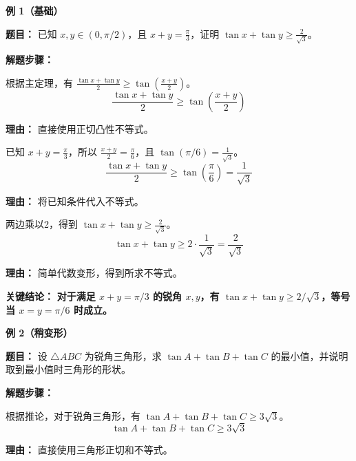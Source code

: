\begin{examplebox}
\textbf{\textcolor{CExample}{例 1（基础）}}

\textbf{\textcolor{CExample}{题目：}} 已知 $x, y \in (0, \pi/2)$，且 $x+y = \frac{\pi}{3}$，证明 $\tan x + \tan y \geq \frac{2}{\sqrt{3}}$。

\textbf{\textcolor{CExample}{解题步骤：}}
\begin{description}[style=nextline, leftmargin=2.8em, labelsep=0.5em, itemsep=0.45em]
    \item[\textbf{第一步（应用主定理）：}] 根据主定理，有 $\frac{\tan x + \tan y}{2} \geq \tan\left(\frac{x+y}{2}\right)$。
    \[
    \frac{\tan x + \tan y}{2} \geq \tan\left(\frac{x+y}{2}\right)
    \]
    \par\textbf{理由：}
    直接使用正切凸性不等式。

    \item[\textbf{第二步（代入已知）：}] 已知 $x+y = \frac{\pi}{3}$，所以 $\frac{x+y}{2} = \frac{\pi}{6}$，且 $\tan(\pi/6) = \frac{1}{\sqrt{3}}$。
    \[
    \frac{\tan x + \tan y}{2} \geq \tan\left(\frac{\pi}{6}\right) = \frac{1}{\sqrt{3}}
    \]
    \par\textbf{理由：}
    将已知条件代入不等式。

    \item[\textbf{第三步（整理结论）：}] 两边乘以2，得到 $\tan x + \tan y \geq \frac{2}{\sqrt{3}}$。
    \[
    \tan x + \tan y \geq 2 \cdot \frac{1}{\sqrt{3}} = \frac{2}{\sqrt{3}}
    \]
    \par\textbf{理由：}
    简单代数变形，得到所求不等式。
\end{description}

\textbf{\textcolor{CExample}{关键结论：}} \textbf{对于满足 $x+y = \pi/3$ 的锐角 $x,y$，有 $\tan x + \tan y \geq 2/\sqrt{3}$，等号当 $x=y=\pi/6$ 时成立。}

\medskip
\textbf{\textcolor{CExample}{例 2（稍变形）}}

\textbf{\textcolor{CExample}{题目：}} 设 $\triangle ABC$ 为锐角三角形，求 $\tan A + \tan B + \tan C$ 的最小值，并说明取到最小值时三角形的形状。

\textbf{\textcolor{CExample}{解题步骤：}}
\begin{description}[style=nextline, leftmargin=2.8em, labelsep=0.5em, itemsep=0.45em]
    \item[\textbf{第一步（应用推论）：}] 根据推论，对于锐角三角形，有 $\tan A + \tan B + \tan C \geq 3\sqrt{3}$。
    \[
    \tan A + \tan B + \tan C \geq 3\sqrt{3}
    \]
    \par\textbf{理由：}
    直接使用三角形正切和不等式。


\end{description}
\end{examplebox}
